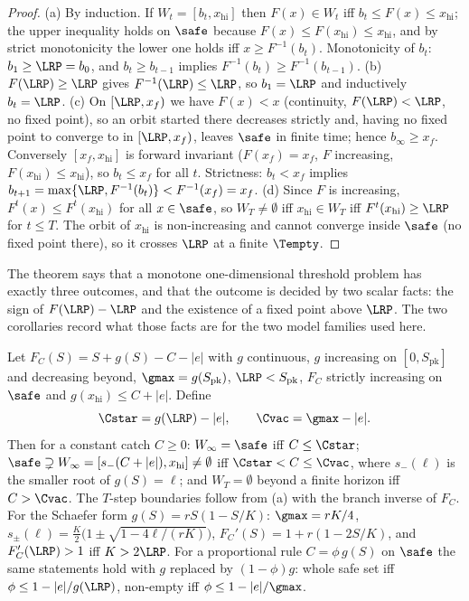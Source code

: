 \begin{proof}
(a) By induction. If $W_t=[b_t,x_{\mathrm{hi}}]$ then $F(x)\in W_t$ iff $b_t\le F(x)\le x_{\mathrm{hi}}$; the upper inequality holds on $\safe$ because $F(x)\le F(x_{\mathrm{hi}})\le x_{\mathrm{hi}}$, and by strict monotonicity the lower one holds iff $x\ge F^{-1}(b_t)$. Monotonicity of $b_t$: $b_1\ge\LRP=b_0$, and $b_t\ge b_{t-1}$ implies $F^{-1}(b_t)\ge F^{-1}(b_{t-1})$. (b) $F(\LRP)\ge\LRP$ gives $F^{-1}(\LRP)\le\LRP$, so $b_1=\LRP$ and inductively $b_t=\LRP$. (c) On $[\LRP,x_f)$ we have $F(x)<x$ (continuity, $F(\LRP)<\LRP$, no fixed point), so an orbit started there decreases strictly and, having no fixed point to converge to in $[\LRP,x_f)$, leaves $\safe$ in finite time; hence $b_\infty\ge x_f$. Conversely $[x_f,x_{\mathrm{hi}}]$ is forward invariant ($F(x_f)=x_f$, $F$ increasing, $F(x_{\mathrm{hi}})\le x_{\mathrm{hi}}$), so $b_t\le x_f$ for all $t$. Strictness: $b_t<x_f$ implies $b_{t+1}=\max\{\LRP,F^{-1}(b_t)\}<F^{-1}(x_f)=x_f$. (d) Since $F$ is increasing, $F^{t}(x)\le F^{t}(x_{\mathrm{hi}})$ for all $x\in\safe$, so $W_T\neq\emptyset$ iff $x_{\mathrm{hi}}\in W_T$ iff $F^{t}(x_{\mathrm{hi}})\ge\LRP$ for $t\le T$. The orbit of $x_{\mathrm{hi}}$ is non-increasing and cannot converge inside $\safe$ (no fixed point there), so it crosses $\LRP$ at a finite $\Tempty$.
\end{proof}

The theorem says that a monotone one-dimensional threshold problem has exactly three outcomes, and that the outcome is decided by two scalar facts: the sign of $F(\LRP)-\LRP$ and the existence of a fixed point above $\LRP$. The two corollaries record what those facts are for the two model families used here.

\begin{corollary}\label{cor:cod}
Let $F_C(S)=S+g(S)-C-|e|$ with $g$ continuous, $g$ increasing on $[0,S_{\mathrm{pk}}]$ and decreasing beyond, $\gmax=g(S_{\mathrm{pk}})$, $\LRP<S_{\mathrm{pk}}$, $F_C$ strictly increasing on $\safe$ and $g(x_{\mathrm{hi}})\le C+|e|$. Define
\[
\Cstar=g(\LRP)-|e|,\qquad \Cvac=\gmax-|e|.
\]
Then for a constant catch $C\ge0$: $W_\infty=\safe$ iff $C\le\Cstar$; $\safe\supsetneq W_\infty=[s_-(C+|e|),x_{\mathrm{hi}}]\neq\emptyset$ iff $\Cstar<C\le\Cvac$, where $s_-(\ell)$ is the smaller root of $g(S)=\ell$; and $W_T=\emptyset$ beyond a finite horizon iff $C>\Cvac$. The $T$-step boundaries follow from (a) with the branch inverse of $F_C$. For the Schaefer form $g(S)=rS(1-S/K)$: $\gmax=rK/4$, $s_\pm(\ell)=\tfrac K2\bigl(1\pm\sqrt{1-4\ell/(rK)}\bigr)$, $F_C'(S)=1+r(1-2S/K)$, and $F_C'(\LRP)>1$ iff $K>2\LRP$. For a proportional rule $C=\phi\,g(S)$ on $\safe$ the same statements hold with $g$ replaced by $(1-\phi)g$: whole safe set iff $\phi\le 1-|e|/g(\LRP)$, non-empty iff $\phi\le1-|e|/\gmax$.
\end{corollary}

